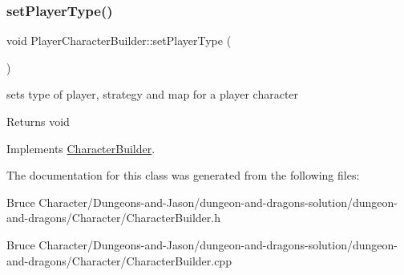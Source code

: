 \subsubsection{\texorpdfstring{set\+Player\+Type()}{setPlayerType()}}
{\footnotesize\ttfamily void Player\+Character\+Builder\+::set\+Player\+Type (\begin{DoxyParamCaption}{ }\end{DoxyParamCaption})\hspace{0.3cm}{\ttfamily [virtual]}}

sets type of player, strategy and map for a player character \begin{DoxyReturn}{Returns}
void 
\end{DoxyReturn}


Implements \hyperlink{class_character_builder}{Character\+Builder}.



The documentation for this class was generated from the following files\+:\begin{DoxyCompactItemize}
\item 
Bruce Character/\+Dungeons-\/and-\/\+Jason/dungeon-\/and-\/dragons-\/solution/dungeon-\/and-\/dragons/\+Character/Character\+Builder.\+h\item 
Bruce Character/\+Dungeons-\/and-\/\+Jason/dungeon-\/and-\/dragons-\/solution/dungeon-\/and-\/dragons/\+Character/Character\+Builder.\+cpp\end{DoxyCompactItemize}

